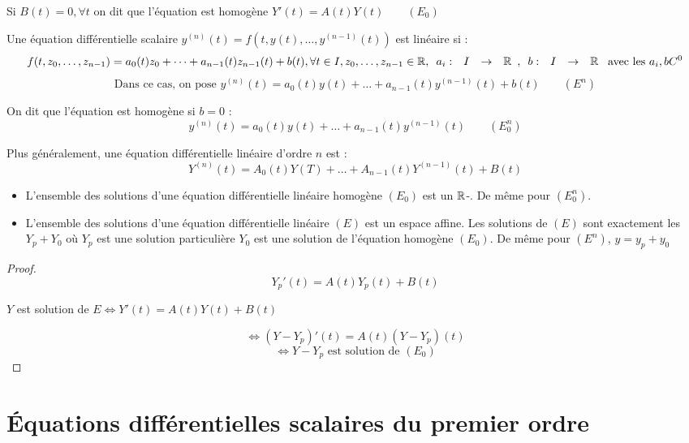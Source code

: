 \documentclass[]{report}
\begin{document}
\begin{re}
    Si $B(t)=0,\forall t$ on dit que l'équation est homogène $Y'(t)=A(t)Y(t)\qquad (E_0)$
\end{re}

\begin{df}
    Une équation différentielle scalaire $y^{(n)}(t)=f(t,y(t),\dots,y^{(n-1)}(t))$ est linéaire si : $$f(t,z_0,\dots,z_{n-1})=a_0(t)z_0+\dots+a_{n-1}(t)z_{n-1}(t)+b(t),\forall t\in I,z_0,\dots,z_{n-1}\in\mathbb{R},\begin{array}{ccccc} a_i : & I & \to & \mathbb{R} \end{array},\begin{array}{ccccc} b : & I & \to & \mathbb{R} \end{array} \text{ avec les }a_i,b C^0$$
    $$\text{Dans ce cas, on pose }y^{(n)}(t)=a_0(t)y(t)+\dots+a_{n-1}(t)y^{(n-1)}(t)+b(t)\qquad (E^n)$$
\end{df}

\begin{re}
    On dit que l'équation est homogène si $b=0$ :
    \[y^{(n)}(t)=a_0(t)y(t)+\dots+a_{n-1}(t)y^{(n-1)}(t)\qquad (E_0^n)\]
\end{re}

\begin{re}
    Plus généralement, une équation différentielle linéaire d'ordre $n$ est :
    \[Y^{(n)}(t)=A_0(t)Y(T)+\ldots+A_{n-1}(t)Y^{(n-1)}(t)+B(t)\]
\end{re}

\begin{prop}
    \begin{itemize}
        \item L'ensemble des solutions d'une équation différentielle linéaire homogène $(E_0)$ est un $\mathbb{R}$-\ev. De même pour $(E_0^n)$.
        \item L'ensemble des solutions d'une équation différentielle linéaire $(E)$ est un espace affine. Les solutions de $(E)$ sont exactement les $Y_p+Y_0$ où $Y_p$ est une solution particulière $Y_0$ est une solution de l'équation homogène $(E_0)$. De même pour $(E^n)$, $y=y_p+y_0$
    \end{itemize}
\end{prop}

\begin{proof}
    \[Y_p'(t)=A(t)Y_p(t)+B(t)\]
    \begin{center}
        $Y$ est solution de $E\iff Y'(t)=A(t)Y(t)+B(t)$
    \end{center}
    \[\iff (Y-Y_p)'(t)=A(t)(Y-Y_p)(t)\]
    \[\iff Y-Y_p\text{ est solution de }(E_0)\]
\end{proof}

\section{Équations différentielles scalaires du premier ordre}
\end{document}
